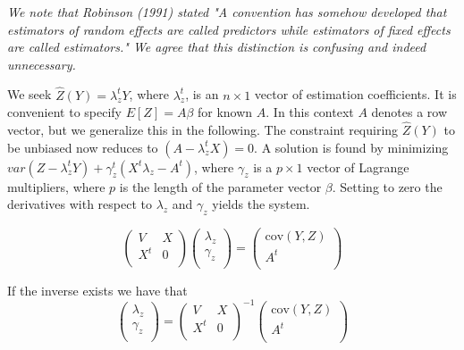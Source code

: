 \documentclass[12pt, a4paper]{article}
\begin{document}
\emph{We note that Robinson (1991) stated "A convention has somehow developed that estimators of random effects are called predictors while estimators of fixed effects are called estimators." We agree that this distinction is confusing and indeed unnecessary.} \\ \bigskip



We seek $\hat{Z}(Y) = \lambda_{z}^{t}Y$, where $ \lambda_{z}^{t}$, is an $n \times 1$ vector of estimation coefficients. It is convenient to specify $E[Z]=A\beta$ for known $A$. In this context $A$ denotes a row vector, but we generalize this in the following. The constraint requiring $\hat{Z}(Y)$ to be unbiased now reduces to $(A -  \lambda_{z}^{t}X) = 0$. A solution is found by minimizing $var(Z -  \lambda_{z}^{t}Y) + \gamma^t_z (X^t\lambda_{z} - A^t)$, where $\gamma_z$ is a $p \times 1$ vector of Lagrange multipliers, where $p$ is the length of the parameter vector $\beta$. Setting to zero the derivatives with respect to $\lambda_{z}$ and $\gamma_z $ yields the system.




\begin{equation}
\left(
\begin{array}{cc}
V & X \\
X^t & 0 \\
\end{array}
\right)\left(
\begin{array}{c}
\lambda_{z}\\
\gamma_z \\
\end{array}
\right)=\left(
\begin{array}{c}
\mbox{cov}(Y,Z)\\
A^{t} \\
\end{array}
\right)
\end{equation}


If the inverse exists we have that
\begin{equation}
\left(
\begin{array}{c}
\lambda_{z}\\
\gamma_z \\
\end{array}
\right)=\left(
\begin{array}{cc}
V & X \\
X^t & 0 \\
\end{array}
\right) ^{-1}\left(
\begin{array}{c}
\mbox{cov}(Y,Z)\\
A^{t} \\
\end{array}
\right)
\end{equation}
\end{document}
